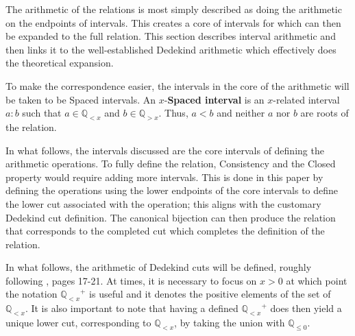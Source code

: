 \documentclass[12pt]{article}
\newcommand{\qcut}[2][x]{\ensuremath{\mathbb{Q}_{#2 #1}}}
\newcommand{\qlt}[1][x]{\qcut[#1]{<}}
\newcommand{\qgt}[1][x]{\qcut[#1]{>}}
\newcommand{\qleq}[1][x]{\qcut[#1]{\leq}}
\begin{document}
The arithmetic of the relations is most simply described as doing the arithmetic on the endpoints of intervals. This creates a core of intervals for which can then be expanded to the full relation. This section describes interval arithmetic and then links it to the well-established Dedekind arithmetic which effectively does the theoretical expansion. 

To make the correspondence easier, the intervals in the core of the arithmetic will be taken to be Spaced intervals. An $x$-\textbf{Spaced interval} is an $x$-related interval $a:b$ such that $a \in \qlt$ and $b \in \qgt$. Thus, $a < b$ and neither $a$ nor $b$ are roots of the relation. 

In what follows, the intervals discussed are the core intervals of defining the arithmetic operations. To fully define the relation, Consistency and the Closed property would require adding more intervals. This is done in this paper by defining the operations using the lower endpoints of the core intervals to define the lower cut associated with the operation; this aligns with the customary Dedekind cut definition. The canonical bijection can then produce the relation that corresponds to the completed cut which completes the definition of the relation. 

In what follows, the arithmetic of Dedekind cuts will be defined, roughly following \cite{rudin}, pages 17-21.  At times, it is necessary to focus on $x > 0$ at which point the notation $\qlt^+$ is useful and it denotes the positive elements of the set of $\qlt$. It is also important to note that having a defined $\qlt^+$ does then yield a unique lower cut, corresponding to $\qlt$, by taking the union with $\qleq[0]$.
\end{document}
